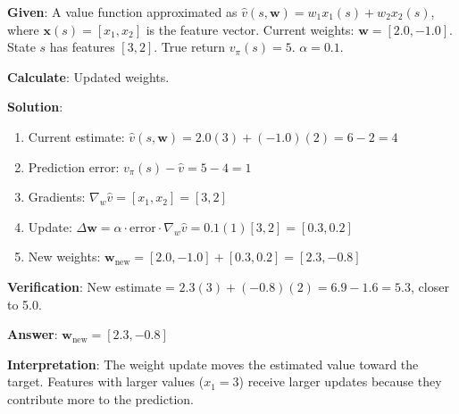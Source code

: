 \documentclass[11pt,a4paper]{article}
\begin{document}
\begin{tcolorbox}[colback=blue!5!white,colframe=blue!75!black,title=\textbf{Worked Example 40: Linear Parameterization Update}]
\textbf{Given}: A value function approximated as $\hat{v}(s, \mathbf{w}) = w_1 x_1(s) + w_2 x_2(s)$, where $\mathbf{x}(s) = [x_1, x_2]$ is the feature vector. Current weights: $\mathbf{w} = [2.0, -1.0]$. State $s$ has features $[3, 2]$. True return $v_\pi(s) = 5$. $\alpha = 0.1$.

\textbf{Calculate}: Updated weights.

\textbf{Solution}:
\begin{enumerate}
    \item Current estimate: $\hat{v}(s, \mathbf{w}) = 2.0(3) + (-1.0)(2) = 6 - 2 = 4$
    \item Prediction error: $v_\pi(s) - \hat{v} = 5 - 4 = 1$
    \item Gradients: $\nabla_w \hat{v} = [x_1, x_2] = [3, 2]$
    \item Update: $\Delta \mathbf{w} = \alpha \cdot \text{error} \cdot \nabla_w \hat{v} = 0.1(1)[3, 2] = [0.3, 0.2]$
    \item New weights: $\mathbf{w}_{\text{new}} = [2.0, -1.0] + [0.3, 0.2] = [2.3, -0.8]$
\end{enumerate}

\textbf{Verification}: New estimate = $2.3(3) + (-0.8)(2) = 6.9 - 1.6 = 5.3$, closer to 5.0.

\textbf{Answer}: $\mathbf{w}_{\text{new}} = [2.3, -0.8]$

\textbf{Interpretation}: The weight update moves the estimated value toward the target. Features with larger values ($x_1 = 3$) receive larger updates because they contribute more to the prediction.
\end{tcolorbox}
\end{document}
